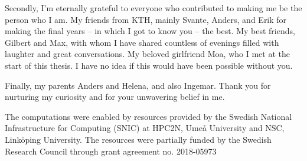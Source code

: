 Secondly, I'm eternally grateful to everyone who contributed to making me be the person who I am. 
My friends from KTH,
mainly Svante, Anders, and Erik for making the final years -- in which I got to know you -- the best. 
My best friends, Gilbert and Max, with whom I have shared countless of evenings filled with laughter and 
great conversations. 
My beloved girlfriend Moa, who I met at the start of this thesis. I have no idea if this would have been possible without you.

Finally, my parents Anders and Helena, and also Ingemar. Thank you for nurturing my curiosity and for your unwavering belief in me.

\vspace{9cm}
The computations were enabled by resources provided by the Swedish
National Infrastructure for Computing (SNIC) at HPC2N, Umeå University
and NSC, Linköping University. The resources were partially funded by the Swedish Research 
Council through grant agreement no. 2018-05973